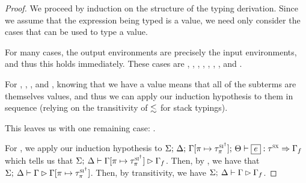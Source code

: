 \begin{proof}
  We proceed by induction on the structure of the typing derivation. Since we
  assume that the expression being typed is a value, we need only consider the
  cases that can be used to type a value.

  For many cases, the output environments are precisely the input environments,
  and thus this holds immediately. These cases are ,
  , , , ,
  , , and .

  For , , , and ,
  knowing that we have a value means that all of the subterms are themselves
  values, and thus we can apply our induction hypothesis to them in sequence
  (relying on the transitivity of $\lesssim$ for stack typings).

  This leaves us with one remaining case: .

  \vspace{1em}
  \noindent \framebox[\textwidth]{ \figuresize
    \begin{mathpar}
      \TDrop
    \end{mathpar}
  } \vspace{1em}

  For , we apply our induction hypothesis to
  $\oxtypjudge{\oxglobalctx}{\oxtvarctx}{\oxkontctx}{
    \oxtupdate{\oxvarctx}{\oxplace}{\oxsidtype_\oxplace}
  }{\oxexpr}{\oxsxtype}{\oxvarctx_f}$ which tells us that
  $\Sigma; \: \Delta \vdash 
    \Gamma [\pi \mapsto \tau^{\textsc{si}^\dagger}_\pi]  \rhd \Gamma_f$. Then,
  by , we have that
  $\Sigma; \: \Delta \vdash \Gamma \rhd \Gamma [\pi \mapsto \tau^{\textsc{si}^\dagger}_\pi]$. Then, by
  transitivity, we have
  $\Sigma; \: \Delta \vdash \Gamma \rhd \Gamma_f$.
\end{proof}


